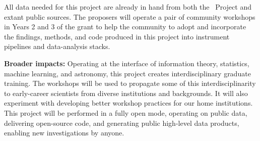 \documentclass[12pt, fullpage, letterpaper]{article}
\begin{document}
All data needed for this project are already in hand from both the
\EXPRES\ Project and extant public sources.
The proposers will operate a pair of community workshops in
Years 2 and 3 of the grant to help the community to adopt and
incorporate the findings, methods, and code produced in this project
into instrument pipelines and data-analysis stacks.

\textbf{Broader impacts:}
Operating at the interface of information theory, statistics, machine learning,
and astronomy, this project creates interdisciplinary graduate training.
The workshops will be used to propagate some of this interdisciplinarity
to early-career scientists from diverse institutions and backgrounds.
It will also experiment with developing better workshop practices for our home institutions.
This project will be performed in a fully open mode, operating on
public data, delivering open-source code, and generating public
high-level data products, enabling new investigations by anyone.
\end{document}
